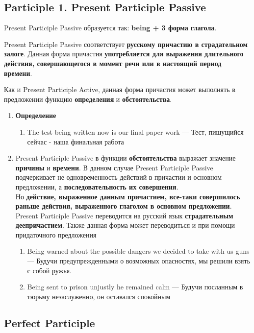 \documentclass{article}
\begin{document}
\subsection{Participle 1. Present Participle Passive}

Present Participle Passive образуется так: \textbf{being + 3 форма глагола}.

Present Participle Passive соответствует \textbf{русскому причастию в страдательном залоге}. Данная форма причастия \textbf{употребляется для выражения длительного действия, совершающегося в момент речи или в настоящий период времени}.

Как и Present Participle Active, данная форма причастия может выполнять в предложении функцию \textbf{определения} и \textbf{обстоятельства}.

\begin{enumerate}
	\item \textbf{Определение}
	\begin{enumerate}
		\item The test being written now is our final paper work — Тест, пишущийся сейчас - наша финальная работа
	\end{enumerate}
	\item Present Participle Passive в функции \textbf{обстоятельства} выражает значение \textbf{причины} и \textbf{времени}. В данном случае Present Participle Passive подчеркивает не одновременность действий в причастии и основном предложении, а \textbf{последовательность их совершения}. \\
	Но \textbf{действие, выраженное данным причастием, все-таки совершилось раньше действия, выраженного глаголом в основном предложении}. Present Participle Passive переводится на русский язык \textbf{страдательным деепричастием}. Также данная форма может переводиться и при помощи придаточного предложения
	\begin{enumerate}
		\item Being warned about the possible dangers we decided to take with us guns — Будучи предупрежденными о возможных опасностях, мы решили взять с собой ружья.
		\item Being sent to prison unjustly he remained calm — Будучи посланным в тюрьму незаслуженно, он оставался спокойным
	\end{enumerate}
\end{enumerate}

\subsection{Perfect Participle}
\end{document}
